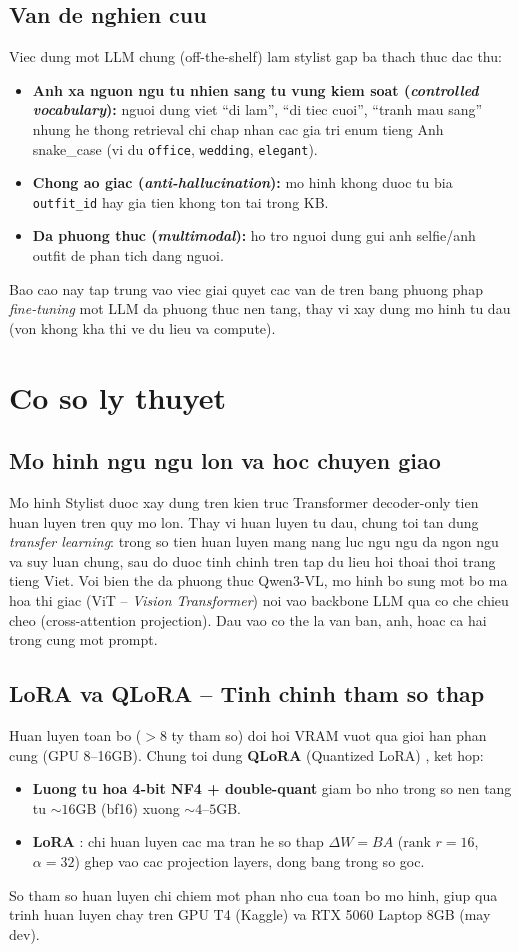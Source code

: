 \documentclass[12pt,a4paper]{article}
\begin{document}
\subsection{Van de nghien cuu}
Viec dung mot LLM chung (off-the-shelf) lam stylist gap ba thach thuc dac thu:
\begin{itemize}
  \item \textbf{Anh xa nguon ngu tu nhien sang tu vung kiem soat (\emph{controlled vocabulary}):}
  nguoi dung viet ``di lam'', ``di tiec cuoi'', ``tranh mau sang'' nhung he thong retrieval
  chi chap nhan cac gia tri enum tieng Anh snake\_case (vi du \texttt{office}, \texttt{wedding}, \texttt{elegant}).
  \item \textbf{Chong ao giac (\emph{anti-hallucination}):} mo hinh khong duoc tu bia
  \texttt{outfit\_id} hay gia tien khong ton tai trong KB.
  \item \textbf{Da phuong thuc (\emph{multimodal}):} ho tro nguoi dung gui anh selfie/anh outfit de phan tich dang nguoi.
\end{itemize}
Bao cao nay tap trung vao viec giai quyet cac van de tren bang phuong phap \emph{fine-tuning}
mot LLM da phuong thuc nen tang, thay vi xay dung mo hinh tu dau (von khong kha thi ve du lieu va compute).
\section{Co so ly thuyet}
\label{sec:theory}
\subsection{Mo hinh ngu ngu lon va hoc chuyen giao}
Mo hinh Stylist duoc xay dung tren kien truc Transformer decoder-only tien huan luyen tren
quy mo lon. Thay vi huan luyen tu dau, chung toi tan dung \emph{transfer learning}: trong so
tien huan luyen mang nang luc ngu ngu da ngon ngu va suy luan chung, sau do duoc tinh chinh
tren tap du lieu hoi thoai thoi trang tieng Viet.
Voi bien the da phuong thuc Qwen3-VL, mo hinh bo sung mot bo ma hoa thi giac (ViT --
\emph{Vision Transformer}) noi vao backbone LLM qua co che chieu cheo (cross-attention
projection). Dau vao co the la van ban, anh, hoac ca hai trong cung mot prompt.
\subsection{LoRA va QLoRA -- Tinh chinh tham so thap}
Huan luyen toan bo ($>8$ ty tham so) doi hoi VRAM vuot qua gioi han phan cung (GPU 8--16GB).
Chung toi dung \textbf{QLoRA} (Quantized LoRA) \cite{dettmers2023qlora}, ket hop:
\begin{itemize}
  \item \textbf{Luong tu hoa 4-bit NF4 + double-quant} giam bo nho trong so nen tang tu
  $\sim 16$GB (bf16) xuong $\sim 4$--$5$GB.
  \item \textbf{LoRA} \cite{hu2021lora}: chi huan luyen cac ma tran he so thap $\Delta W = BA$
  ($\text{rank } r=16$, $\alpha=32$) ghep vao cac projection layers, dong bang trong so goc.
\end{itemize}
So tham so huan luyen chi chiem mot phan nho cua toan bo mo hinh, giup qua trinh huan luyen
chay tren GPU T4 (Kaggle) va RTX 5060 Laptop 8GB (may dev).
\end{document}
